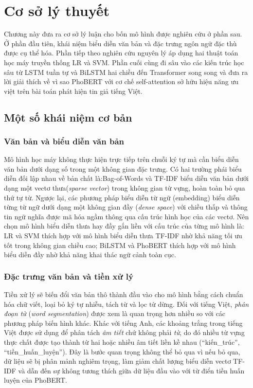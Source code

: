 \documentclass[12pt, a4paper]{report}
\begin{document}
\setcounter{page}{1}
\hypersetup{pageanchor=true}
\chapter{Cơ sở lý thuyết}

Chương này đưa ra cơ sở lý luận cho bốn mô hình được nghiên cứu ở phần sau. Ở phần đầu tiên, khái niệm biểu diễn văn bản và đặc trưng ngôn ngữ đặc thù được cụ thể hóa. Phần tiếp theo nghiên cứu nguyên lý áp dụng hai thuật toán học máy truyền thống LR và SVM. Phần cuối cùng đi sâu vào các kiến trúc học sâu từ LSTM tuần tự và BiLSTM hai chiều đến Transformer song song và đưa ra lời giải thích về vì sao PhoBERT với cơ chế self-attention sở hữu hiệu năng ưu việt trên bài toán phát hiện tin giả tiếng Việt.

\section{Một số khái niệm cơ bản}

\subsection{Văn bản và biểu diễn văn bản}
Mô hình học máy không thực hiện trực tiếp trên chuỗi ký tự mà cần biểu diễn văn bản dưới dạng số trong một không gian đặc trưng. Có hai trường phái biểu diễn đối lập nhau về bản chất là:Bag-of-Words và TF-IDF biểu diễn văn bản dưới dạng một vectơ thưa(\textit{sparse vector}) trong không gian từ vựng, hoàn toàn bỏ qua thứ tự từ. Ngược lại, các phương pháp biểu diễn từ ngữ (embedding) biểu diễn từng từ ngữ dưới dạng một không gian đầy (\textit{dense space}) với chiều thấp và thông tin ngữ nghĩa được mã hóa ngầm thông qua cấu trúc hình học của các vectơ. Nên chọn mô hình biểu diễn thưa hay đầy gắn liền với cấu trúc của từng mô hình là:
LR và SVM thích hợp với mô hình biểu diễn thưa TF-IDF nhờ khả năng tối ưu tốt trong không gian chiều cao;
BiLSTM và PhoBERT thích hợp với mô hình biểu diễn đầy nhờ khả năng khai thác ngữ cảnh toàn cục.

\subsection{Đặc trưng văn bản và tiền xử lý}
Tiền xử lý sẽ biến đổi văn bản thô thành đầu vào cho mô hình bằng cách chuẩn hóa chữ viết, loại bỏ ký tự nhiễu, tách từ và lọc từ dừng. Đối với tiếng Việt, \textit{phân đoạn từ} (\textit{word segmentation}) được xem là quan trọng hơn nhiều so với các phương pháp biến hình khác. Khác với tiếng Anh, các khoảng trắng trong tiếng Việt được sử dụng để phân tách \textit{âm tiết} chứ không phải \textit{từ}, do đó nhiều từ vựng thực chất được tạo thành từ hai hoặc nhiều âm tiết liền kề nhau (``kiến\_trúc'', ``tiền\_huấn\_luyện''). Đây là bước quan trọng không thể bỏ qua vì nếu bỏ qua, dữ liệu sẽ bị phân mảnh nghiêm trọng, làm giảm chất lượng biểu diễn vectơ TF-IDF và dẫn đến sự không tương thích giữa dữ liệu đầu vào với từ điển tiền huấn luyện của PhoBERT.
\end{document}
